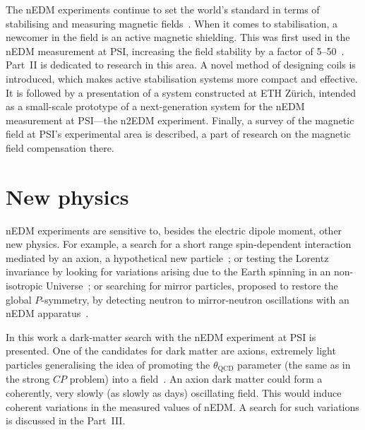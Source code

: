 The nEDM experiments continue to set the world's standard in terms of stabilising and measuring magnetic fields~\cite{GREEN1998381,1748-0221-10-12-P12003,Groeger2005,Baker2014}. When it comes to stabilisation, a newcomer in the field is an active magnetic shielding.
This was first used in the nEDM measurement at PSI, increasing the field stability by a factor of 5--50~\cite{Afach2014}. Part~II is dedicated to research in this area. A novel method of designing coils is introduced, which makes active stabilisation systems more compact and effective. It is followed by a presentation of a system constructed at ETH Zürich, intended as a small-scale prototype of a next-generation system for the nEDM measurement at PSI---the n2EDM experiment. Finally, a survey of the magnetic field at PSI's experimental area is described, a part of research on the magnetic field compensation there.




\section{New physics}
nEDM experiments are sensitive to, besides the electric dipole moment, other new physics. For example, a search for a short range spin-dependent interaction mediated by an axion, a hypothetical new particle~\cite{Afach2015Exotic}; or testing the Lorentz invariance by looking for variations arising due to the Earth spinning in an non-isotropic Universe~\cite{Altarev2009,ALTAREV20112365}; or searching for mirror particles, proposed to restore the global $P$-symmetry, by detecting neutron to mirror-neutron oscillations with an nEDM apparatus~\cite{PhysRevD.80.032003}.

In this work a dark-matter search with the nEDM experiment at PSI is presented.
One of the candidates for dark matter are axions, extremely light particles generalising the idea of promoting the $\theta_\text{QCD}$ parameter (the same as in the strong $CP$ problem) into a field~\cite{PhysRevLett.38.1440}. An axion dark matter could form a coherently, very slowly (as slowly as days) oscillating field. This would induce coherent variations in the measured values of nEDM\@. A search for such variations is discussed in the Part~III\@.